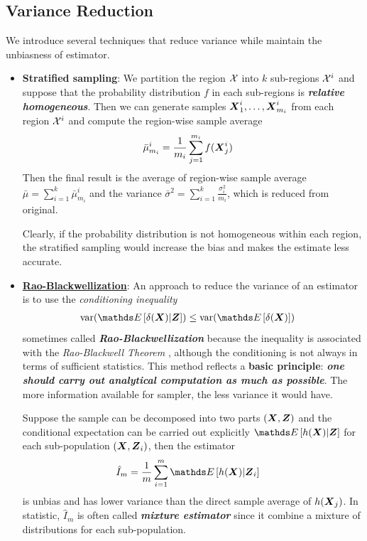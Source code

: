 \documentclass[11pt]{article}
\begin{document}
\subsection{Variance Reduction}
We introduce several techniques that reduce variance while maintain the unbiasness of estimator.
\begin{itemize}
\item \textbf{Stratified sampling}: We partition the region ${\mathcal X}$ into $k$ sub-regions ${\mathcal X}^{i}$ and suppose that the probability distribution $f$ in each sub-regions is \emph{\textbf{relative homogeneous}}. Then we can generate samples $\boldsymbol{X}_{1}^{i}, \ldots, \boldsymbol{X}_{m_i}^{i}$ from each region ${\mathcal X}^{i}$ and compute the region-wise sample average 
\begin{align*}
\bar{\mu}_{m_i}^{i} &= \frac{1}{m_i}\sum_{j=1}^{m_i}f(\boldsymbol{X}_{j}^{i})
\end{align*} Then the final result is the average of region-wise sample average $\bar{\mu} = \sum_{i=1}^{k}\bar{\mu}_{m_i}^{i}$ and the variance $\bar{\sigma}^2 = \sum_{i=1}^{k}\frac{\sigma_{i}^{2}}{m_i}$, which is reduced from original. 

Clearly, if the probability distribution is not homogeneous within each region, the stratified sampling would increase the bias and makes the estimate less accurate.

\item \underline{\textbf{Rao-Blackwellization}}: An approach to reduce the variance of an estimator is to use the \emph{conditioning inequality}
\begin{align}
\text{var}(\E{}{\delta(\mb{X})|\mb{Z}}) &\le \text{var}(\E{}{\delta(\mb{X})}) \label{eqn: rao_blackwell}
\end{align} sometimes called \textbf{\emph{Rao-Blackwellization}} \citep{liu2001monte} because the inequality is associated with the \emph{Rao-Blackwell Theorem} \citep{lehmann2006theory}, although the conditioning is not always in terms of sufficient statistics. This method reflects a \textbf{basic principle}: \emph{\textbf{one should carry out analytical computation as much as possible}}. The more information available for sampler, the less variance it would have. 

Suppose the sample can be decomposed into two parts $(\boldsymbol{X}, \boldsymbol{Z})$ and the conditional expectation can be carried out explicitly $\E{}{h(\mb{X}) | \mb{Z}}$ for each sub-population $(\boldsymbol{X}, \boldsymbol{Z}_i)$, then the estimator 
\begin{align*}
\hat{I}_{m} &= \frac{1}{m}\sum_{i=1}^{m}\E{}{h(\mb{X}) | \mb{Z}_{i}}
\end{align*} is unbias and has lower variance than the direct sample average of $h(\boldsymbol{X}_{j})$. In statistic, $\hat{I}_{m}$ is often called \emph{\textbf{mixture estimator}} since it combine a mixture of distributions for each sub-population.


\end{itemize}
\end{document}
